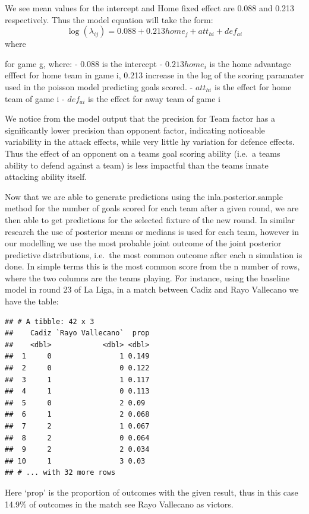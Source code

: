 \documentclass[
]{article}
\begin{document}
We see mean values for the intercept and Home fixed effect are 0.088 and
0.213 respectively. Thus the model equation will take the form:
\[\log(\lambda_{ij}) = 0.088 + 0.213{home}_j + {att}_{hi} + {def}_{ai} \]
where

for game g, where: - 0.088 is the intercept - \(0.213home_i\) is the
home advantage efffect for home team in game i, 0.213 increase in the
log of the scoring paramater used in the poisson model predicting goals
scored. - \({att}_{hi}\) is the effect for home team of game i -
\({def}_{ai}\) is the effect for away team of game i

We notice from the model output that the precision for Team factor has a
significantly lower precision than opponent factor, indicating
noticeable variability in the attack effects, while very little hy
variation for defence effects. Thus the effect of an opponent on a teams
goal scoring ability (i.e.~a teams ability to defend against a team) is
less impactful than the teams innate attacking ability itself.

Now that we are able to generate predictions using the
inla.posterior.sample method for the number of goals scored for each
team after a given round, we are then able to get predictions for the
selected fixture of the new round. In similar research the use of
posterior means or medians is used for each team, however in our
modelling we use the most probable joint outcome of the joint posterior
predictive distributions, i.e.~the most common outcome after each n
simulation is done. In simple terms this is the most common score from
the n number of rows, where the two columns are the teams playing. For
instance, using the baseline model in round 23 of La Liga, in a match
between Cadiz and Rayo Vallecano we have the table:

\begin{verbatim}
## # A tibble: 42 x 3
##    Cadiz `Rayo Vallecano`  prop
##    <dbl>            <dbl> <dbl>
##  1     0                1 0.149
##  2     0                0 0.122
##  3     1                1 0.117
##  4     1                0 0.113
##  5     0                2 0.09 
##  6     1                2 0.068
##  7     2                1 0.067
##  8     2                0 0.064
##  9     2                2 0.034
## 10     1                3 0.03 
## # ... with 32 more rows
\end{verbatim}

Here `prop' is the proportion of outcomes with the given result, thus in
this case 14.9\% of outcomes in the match see Rayo Vallecano as victors.
\end{document}
